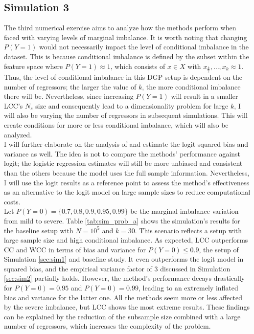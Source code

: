 \subsection{Simulation 3}
\label{sec:sim3}

The third numerical exercise aims to analyze how the methods perform when faced with varying levels of marginal imbalance. It is worth noting that changing $P(Y=1)$ would not necessarily impact the level of conditional imbalance in the dataset. This is because conditional imbalance is defined by the subset within the feature space where $P(Y=1) \approx 1$, which consists of $x \in X$ with $x_{\frac{k}{2}}, \dots, x_k\approx1$. Thus, the level of conditional imbalance in this DGP setup is dependent on the number of regressors; the larger the value of $k$, the more conditional imbalance there will be. Nevertheless, since increasing  $P(Y=1)$ will result in a smaller LCC's $N_s$ size and consequently lead to a dimensionality problem for large $k$, I will also be varying the number of regressors in subsequent simulations. This will create conditions for more or less conditional imbalance, which will also be analyzed.\\

I will further elaborate on the analysis of \textcite{hastie2014} and estimate the logit squared bias and variance as well. The idea is not to compare the methods' performance against logit; the logistic regression estimates will still be more unbiased and consistent than the others because the model uses the full sample information. Nevertheless, I will use the logit results as a reference point to assess the method's effectiveness as an alternative to the logit model on large sample sizes to reduce computational costs. \\

Let $P(Y=0) = \{0.7, 0.8, 0.9, 0.95, 0.99\}$ be the marginal imbalance variation from mild to severe. Table \ref{tab:sim_prob_a} shows the simulation's results for the baseline setup with $N=10^5$ and $k=30$. This scenario reflects a setup with large sample size and high conditional imbalance. As expected, LCC outperforms CC and WCC in terms of bias and variance for $P(Y=0)\leq0.9$, the setup of Simulation \ref{sec:sim1} and \textcite{hastie2014} baseline study. It even outperforms the logit model in squared bias, and the empirical variance factor of $3$ discussed in Simulation \ref{sec:sim2} partially holds. However, the method's performance decays drastically for $P(Y=0)=0.95$ and $P(Y=0)=0.99$, leading to an extremely inflated bias and variance for the latter one. All the methods seem more or less affected by the severe imbalance, but LCC shows the most extreme results. These findings can be explained by the reduction of the subsample size combined with a large number of regressors, which increases the complexity of the problem. \\

